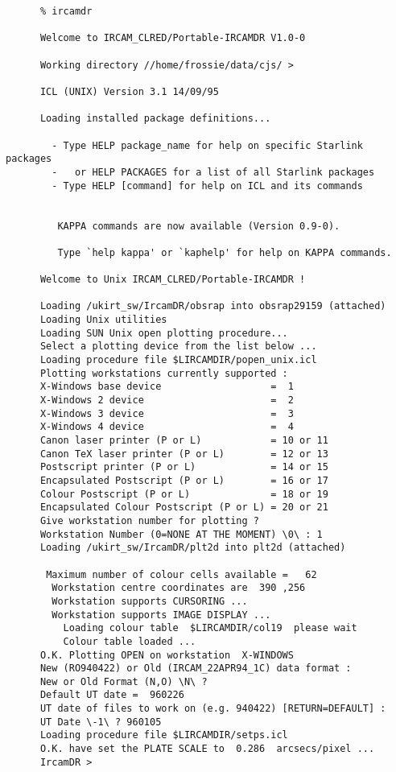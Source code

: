 \begin{small}
\begin{verbatim}
      % ircamdr

      Welcome to IRCAM_CLRED/Portable-IRCAMDR V1.0-0

      Working directory //home/frossie/data/cjs/ >

      ICL (UNIX) Version 3.1 14/09/95

      Loading installed package definitions...

        - Type HELP package_name for help on specific Starlink packages
        -   or HELP PACKAGES for a list of all Starlink packages
        - Type HELP [command] for help on ICL and its commands


         KAPPA commands are now available (Version 0.9-0).

         Type `help kappa' or `kaphelp' for help on KAPPA commands.

      Welcome to Unix IRCAM_CLRED/Portable-IRCAMDR !

      Loading /ukirt_sw/IrcamDR/obsrap into obsrap29159 (attached)
      Loading Unix utilities
      Loading SUN Unix open plotting procedure...
      Select a plotting device from the list below ...
      Loading procedure file $LIRCAMDIR/popen_unix.icl
      Plotting workstations currently supported :
      X-Windows base device                   =  1
      X-Windows 2 device                      =  2
      X-Windows 3 device                      =  3
      X-Windows 4 device                      =  4
      Canon laser printer (P or L)            = 10 or 11
      Canon TeX laser printer (P or L)        = 12 or 13
      Postscript printer (P or L)             = 14 or 15
      Encapsulated Postscript (P or L)        = 16 or 17
      Colour Postscript (P or L)              = 18 or 19
      Encapsulated Colour Postscript (P or L) = 20 or 21
      Give workstation number for plotting ?
      Workstation Number (0=NONE AT THE MOMENT) \0\ : 1
      Loading /ukirt_sw/IrcamDR/plt2d into plt2d (attached)

       Maximum number of colour cells available =   62
        Workstation centre coordinates are  390 ,256
        Workstation supports CURSORING ...
        Workstation supports IMAGE DISPLAY ...
          Loading colour table  $LIRCAMDIR/col19  please wait
          Colour table loaded ...
      O.K. Plotting OPEN on workstation  X-WINDOWS
      New (RO940422) or Old (IRCAM_22APR94_1C) data format :
      New or Old Format (N,O) \N\ ?
      Default UT date =  960226
      UT date of files to work on (e.g. 940422) [RETURN=DEFAULT] :
      UT Date \-1\ ? 960105
      Loading procedure file $LIRCAMDIR/setps.icl
      O.K. have set the PLATE SCALE to  0.286  arcsecs/pixel ...
      IrcamDR >
\end{verbatim}
\end{small}

